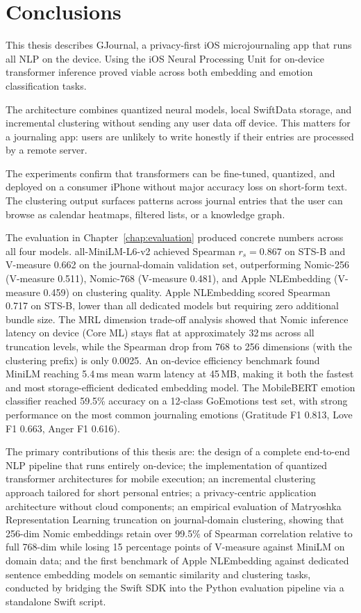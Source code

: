 \chapter{Conclusions}
\label{conclusions}

This thesis describes GJournal, a privacy-first iOS microjournaling app that runs all NLP on the device. Using the iOS Neural Processing Unit for on-device transformer inference proved viable across both embedding and emotion classification tasks.

The architecture combines quantized neural models, local SwiftData storage, and incremental clustering without sending any user data off device. This matters for a journaling app: users are unlikely to write honestly if their entries are processed by a remote server.

The experiments confirm that transformers can be fine-tuned, quantized, and deployed on a consumer iPhone without major accuracy loss on short-form text. The clustering output surfaces patterns across journal entries that the user can browse as calendar heatmaps, filtered lists, or a knowledge graph.

\par
The evaluation in Chapter~\ref{chap:evaluation} produced concrete numbers across all four models. all-MiniLM-L6-v2 achieved Spearman $r_s = 0.867$ on STS-B and V-measure 0.662 on the journal-domain validation set, outperforming Nomic-256 (V-measure 0.511), Nomic-768 (V-measure 0.481), and Apple NLEmbedding (V-measure 0.459) on clustering quality. Apple NLEmbedding scored Spearman 0.717 on STS-B, lower than all dedicated models but requiring zero additional bundle size. The MRL dimension trade-off analysis showed that Nomic inference latency on device (Core ML) stays flat at approximately 32\,ms across all truncation levels, while the Spearman drop from 768 to 256 dimensions (with the clustering prefix) is only 0.0025. An on-device efficiency benchmark found MiniLM reaching 5.4\,ms mean warm latency at 45\,MB, making it both the fastest and most storage-efficient dedicated embedding model. The MobileBERT emotion classifier reached 59.5\% accuracy on a 12-class GoEmotions test set, with strong performance on the most common journaling emotions (Gratitude F1 0.813, Love F1 0.663, Anger F1 0.616).

\par
The primary contributions of this thesis are: the design of a complete end-to-end NLP pipeline that runs entirely on-device; the implementation of quantized transformer architectures for mobile execution; an incremental clustering approach tailored for short personal entries; a privacy-centric application architecture without cloud components; an empirical evaluation of Matryoshka Representation Learning truncation on journal-domain clustering, showing that 256-dim Nomic embeddings retain over 99.5\% of Spearman correlation relative to full 768-dim while losing 15 percentage points of V-measure against MiniLM on domain data; and the first benchmark of Apple NLEmbedding against dedicated sentence embedding models on semantic similarity and clustering tasks, conducted by bridging the Swift SDK into the Python evaluation pipeline via a standalone Swift script.

